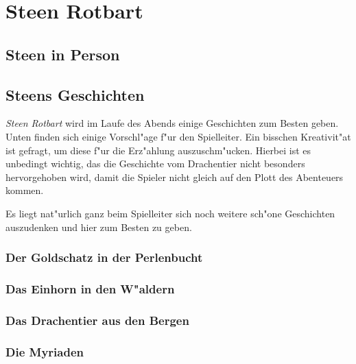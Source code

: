 \chapter{Steen Rotbart}

\section{Steen in Person}

\section{Steens Geschichten}
\par \textit{Steen Rotbart} wird im Laufe des Abends einige Geschichten zum Besten geben. Unten finden sich einige Vorschl"age f"ur den Spielleiter. Ein bisschen Kreativit"at ist gefragt, um diese f"ur die Erz"ahlung auszuschm"ucken. Hierbei ist es unbedingt wichtig, das die Geschichte vom Drachentier nicht besonders hervorgehoben wird, damit die Spieler nicht gleich auf den Plott des Abenteuers kommen.
\par Es liegt nat"urlich ganz beim Spielleiter sich noch weitere sch"one Geschichten auszudenken und hier zum Besten zu geben.

\subsection{Der Goldschatz in der Perlenbucht}

\subsection{Das Einhorn in den W"aldern}

\subsection{Das Drachentier aus den Bergen} 

\subsection{Die Myriaden}
